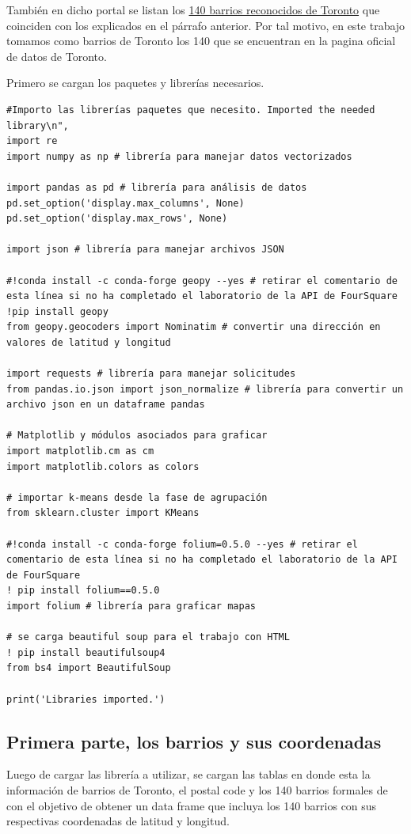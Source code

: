 \documentclass[10pt,a4paper,arial, spanish]{article}
\begin{document}
También en dicho portal se listan los  {\href{https://www.toronto.ca/city-government/data-research-maps/neighbourhoods-communities/neighbourhood-profiles/}{140 barrios reconocidos de Toronto}} que coinciden con los explicados en el párrafo anterior. Por tal motivo, en este trabajo tomamos como barrios de Toronto los 140 que se encuentran en la pagina oficial de datos de Toronto. 

Primero se cargan los paquetes y librerías necesarios.

\begin{verbatim}
#Importo las librerías paquetes que necesito. Imported the needed library\n",
import re
import numpy as np # librería para manejar datos vectorizados

import pandas as pd # librería para análisis de datos
pd.set_option('display.max_columns', None)
pd.set_option('display.max_rows', None)

import json # librería para manejar archivos JSON 

#!conda install -c conda-forge geopy --yes # retirar el comentario de esta línea si no ha completado el laboratorio de la API de FourSquare 
!pip install geopy
from geopy.geocoders import Nominatim # convertir una dirección en valores de latitud y longitud

import requests # librería para manejar solicitudes
from pandas.io.json import json_normalize # librería para convertir un archivo json en un dataframe pandas

# Matplotlib y módulos asociados para graficar
import matplotlib.cm as cm
import matplotlib.colors as colors

# importar k-means desde la fase de agrupación
from sklearn.cluster import KMeans

#!conda install -c conda-forge folium=0.5.0 --yes # retirar el comentario de esta línea si no ha completado el laboratorio de la API de FourSquare
! pip install folium==0.5.0
import folium # librería para graficar mapas 

# se carga beautiful soup para el trabajo con HTML
! pip install beautifulsoup4
from bs4 import BeautifulSoup

print('Libraries imported.')
\end{verbatim}
\subsection{Primera parte, los barrios y sus coordenadas}
Luego de cargar las librería a utilizar,  se cargan las tablas en donde esta la información de barrios de Toronto, el postal code y los 140 barrios formales de con el objetivo de obtener un data frame que incluya los 140 barrios con sus respectivas coordenadas de latitud y longitud.
\end{document}
